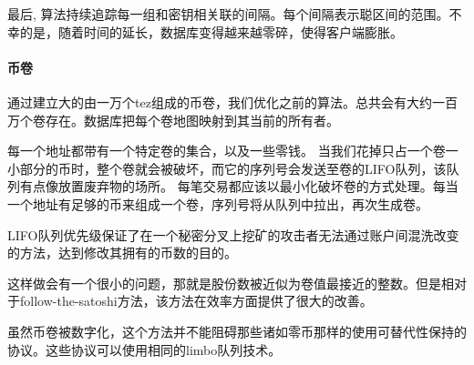 \documentclass[letterpaper]{article}
\begin{document}
最后, 算法持续追踪每一组和密钥相关联的间隔。每个间隔表示聪区间的范围。不幸的是，随着时间的延长，数据库变得越来越零碎，使得客户端膨胀。

\paragraph{币卷}
通过建立大的由一万个tez组成的币卷，我们优化之前的算法。总共会有大约一百万个卷存在。数据库把每个卷地图映射到其当前的所有者。

每一个地址都带有一个特定卷的集合，以及一些零钱。
当我们花掉只占一个卷一小部分的币时，整个卷就会被破坏，而它的序列号会发送至卷的LIFO队列，该队列有点像放置废弃物的场所。
每笔交易都应该以最小化破坏卷的方式处理。每当一个地址有足够的币来组成一个卷，序列号将从队列中拉出，再次生成卷。


LIFO队列优先级保证了在一个秘密分叉上挖矿的攻击者无法通过账户间混洗改变的方法，达到修改其拥有的币数的目的。

这样做会有一个很小的问题，那就是股份数被近似为卷值最接近的整数。但是相对于follow-the-satoshi方法，该方法在效率方面提供了很大的改善。

虽然币卷被数字化，这个方法并不能阻碍那些诸如零币那样的使用可替代性保持的协议。这些协议可以使用相同的limbo队列技术。
\end{document}
